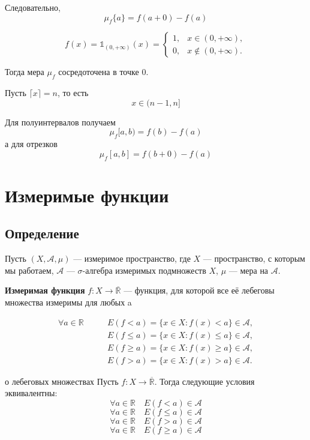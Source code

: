 \documentclass[12pt,a4paper]{article}
\begin{document}
Следовательно,
\[
    \mu_f\{a\}=f(a+0)-f(a)
\]

\begin{example}

    \[
        f(x)=\mathds{1}_{(0,+\infty)}(x)=
        \begin{cases}
            1, & x\in(0,+\infty),\\
            0, & x\notin(0,+\infty).
        \end{cases}
    \]

    Тогда мера $\mu_f$ сосредоточена в точке $0$.
\end{example}

Пусть $\lceil x\rceil=n$, то есть
\[
    x\in(n-1,n]
\]

Для полуинтервалов получаем
\[
    \mu_f[a,b)=f(b)-f(a)
\]
а для отрезков
\[
    \mu_f[a,b]=f(b+0)-f(a)
\]

\newpage

\section{Измеримые функции}

\subsection{Определение}

Пусть $(X,\mathcal{A},\mu)$ --- измеримое пространство, где $X$ --- пространство, с которым мы работаем, $\mathcal{A}$ --- $\sigma$-алгебра измеримых подмножеств $X$, $\mu$ --- мера на $\mathcal{A}$.

\begin{definition}
    \textbf{Измеримая функция} $f:X\to\overline{\mathbb{R}}$ --- функция, для которой все её лебеговы множества измеримы для любых a

    \begin{align*}
        \forall a\in\mathbb{R}\qquad
        &E(f<a)=\{x\in X:f(x)<a\}\in\mathcal{A},\\
        &E(f\leq a)=\{x\in X:f(x)\leq a\}\in\mathcal{A},\\
        &E(f\geq a)=\{x\in X:f(x)\geq a\}\in\mathcal{A},\\
        &E(f>a)=\{x\in X:f(x)>a\}\in\mathcal{A}.
    \end{align*}

\end{definition}

\begin{theorem}{о лебеговых множествах}
    Пусть $f:X\to\overline{\mathbb{R}}$. Тогда следующие условия эквивалентны:
    \[
        \forall a\in\mathbb{R}\quad E(f<a)\in\mathcal{A}
    \]
    \[
        \forall a\in\mathbb{R}\quad E(f\leq a)\in\mathcal{A}
    \]
    \[
        \forall a\in\mathbb{R}\quad E(f>a)\in\mathcal{A}
    \]
    \[
        \forall a\in\mathbb{R}\quad E(f\geq a)\in\mathcal{A}
    \]
\end{theorem}
\end{document}
